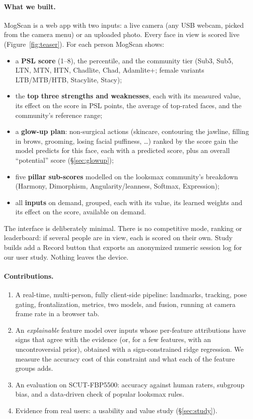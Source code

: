 \documentclass[sigconf,nonacm]{acmart}
\begin{document}
\paragraph{What we built.}
MogScan is a web app with two inputs: a live camera (any USB webcam, picked from the camera menu) or an
uploaded photo. Every face in view is scored live (Figure~\ref{fig:teaser}). For each person MogScan shows:
\begin{itemize}[leftmargin=*,nosep]
  \item a \textbf{PSL score} (1--8), the percentile, and the community tier (Sub3, Sub5, LTN, MTN, HTN, Chadlite, Chad, Adamlite+;
        female variants LTB/MTB/HTB, Stacylite, Stacy);
  \item the \textbf{top three strengths and weaknesses}, each with its measured value, its effect on the score in PSL points,
        the average of top-rated faces, and the community's reference range;
  \item a \textbf{glow-up plan}: non-surgical actions (skincare, contouring the jawline, filling in brows,
        grooming, losing facial puffiness, \dots) ranked by the score gain the model predicts for this face, each
        with a predicted score, plus an overall ``potential'' score (\S\ref{sec:glowup});
  \item five \textbf{pillar sub-scores} modelled on the looksmax community's breakdown (Harmony, Dimorphism,
        Angularity/leanness, Softmax, Expression);
  \item all \textbf{\nFeatures{} inputs} on demand, grouped, each with its value, its learned weights and its
        effect on the score, available on demand.
\end{itemize}
The interface is deliberately minimal. There is no competitive mode, ranking or leaderboard: if several
people are in view, each is scored on their own. Study builds add a Record button that exports an anonymized
numeric session log for our user study. Nothing leaves the device.

\paragraph{Contributions.}
\begin{enumerate}[leftmargin=*,nosep]
  \item A real-time, multi-person, fully client-side pipeline: landmarks, tracking, pose gating,
        frontalization, metrics, two models, and fusion, running at camera frame rate in a browser tab.
  \item An \emph{explainable} feature model over \nFeatures{} inputs whose per-feature attributions have signs that
        agree with the evidence (or, for a few features, with an uncontroversial prior), obtained with a
        sign-constrained ridge regression. We measure the accuracy cost of this constraint and what each of the
        \nGroups{} feature groups adds.
  \item An evaluation on SCUT-FBP5500: accuracy against human raters, subgroup bias, and a
        data-driven check of popular looksmax rules.
  \item Evidence from real users: a usability and value study (\S\ref{sec:study}).
\end{enumerate}
\end{document}
